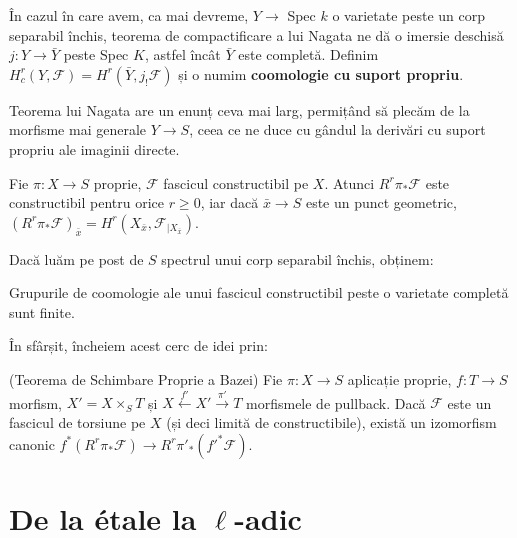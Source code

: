 \documentclass[13pt,openany]{book}
\begin{document}
În cazul în care avem, ca mai devreme, $Y \rightarrow$ Spec $k$ o varietate peste un corp separabil închis, teorema de compactificare a lui Nagata ne dă o imersie deschisă $j: Y \rightarrow \bar{Y}$ peste Spec $K$, astfel încât $\bar{Y}$ este completă. Definim $H^r_c(Y,\mathcal{F}) = H^r(\bar{Y},j_!\mathcal{F})$ și o numim {\bf coomologie cu suport propriu}.

Teorema lui Nagata are un enunț ceva mai larg, permițând să plecăm de la morfisme mai generale $Y \rightarrow S$, ceea ce ne duce cu gândul la derivări cu suport propriu ale imaginii directe.

\begin{teo}
Fie $\pi: X \rightarrow S$ proprie, $\mathcal{F}$ fascicul constructibil pe $X$. Atunci $R^r\pi_*\mathcal{F}$ este constructibil pentru orice $r \geq 0$, iar dacă $\bar{x} \rightarrow S$ este un punct geometric, $(R^r\pi_*\mathcal{F})_{\bar{x}} = H^r(X_{\bar{x}},\mathcal{F}_{\mid X_{\bar{x}}})$.
\end{teo}

Dacă luăm pe post de $S$ spectrul unui corp separabil închis, obținem:

\begin{cor}
Grupurile de coomologie ale unui fascicul constructibil peste o varietate completă sunt finite.
\end{cor}

În sfârșit, încheiem acest cerc de idei prin:

\begin{teo}
(Teorema de Schimbare Proprie a Bazei) Fie $\pi: X \rightarrow S$ aplicație proprie, $f: T \rightarrow S$ morfism, $X' = X \times_S T$ și $X\xleftarrow{f'}X'\xrightarrow{\pi'}T$ morfismele de pullback. Dacă $\mathcal{F}$ este un fascicul de torsiune pe $X$ (și deci limită de constructibile), există un izomorfism canonic $f^*(R^r\pi_*\mathcal{F}) \rightarrow R^r\pi'_*(f'^*\mathcal{F})$.
\end{teo}









\chapter{De la étale la \texorpdfstring{$\ell$}{l}-adic}
\end{document}
